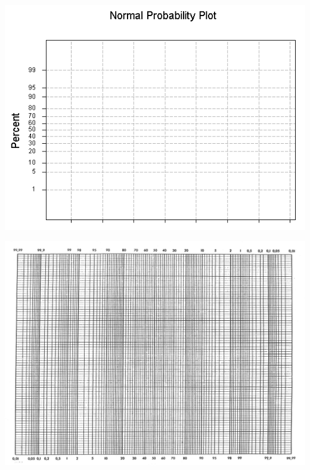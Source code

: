 \documentclass[
  10pt,
  ignorenonframetext,
]{beamer}
\begin{document}
\begin{frame}{}
\protect\hypertarget{section-42}{}
\includegraphics[width=2\textwidth,height=\textheight]{figuras/probpaperLandscape2.png}
\end{frame}

\begin{frame}{}
\protect\hypertarget{section-43}{}
\includegraphics{figuras/probpaperLandscape.png}
\end{frame}
\end{document}
